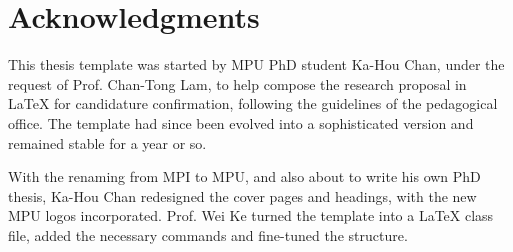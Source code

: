 \chapter{Acknowledgments}

This thesis template was started by MPU PhD student Ka-Hou Chan, under the request of Prof. Chan-Tong Lam,
to help compose the research proposal in \LaTeX{} for candidature confirmation, following the guidelines of the pedagogical office.
The template had since been evolved into a sophisticated version and remained stable for a year or so.

With the renaming from MPI to MPU, and also about to write his own PhD thesis, Ka-Hou Chan redesigned the cover pages and headings, with the new MPU logos incorporated.
Prof. Wei Ke turned the template into a \LaTeX{} class file, added the necessary commands and fine-tuned the structure.

\endinput